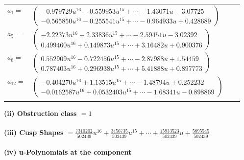 \documentclass[1p]{elsarticle_modified}
\theoremstyle{definition}
\begin{document}
\begin{tabular}{m{7pt} m{180pt} m{7pt} m{180pt} }
\flushright $a_{1}=$&$\begin{pmatrix}-0.979729 u^{16}-0.559953 u^{15}+\cdots-1.43071 u-3.07725\\-0.565850 u^{16}-0.255541 u^{15}+\cdots-0.964933 u+0.428689\end{pmatrix}$ \\
\flushright $a_{5}=$&$\begin{pmatrix}-2.22373 u^{16}-2.33836 u^{15}+\cdots-2.59451 u-3.02392\\0.499460 u^{16}+0.149873 u^{15}+\cdots+3.16482 u+0.900376\end{pmatrix}$ \\
\flushright $a_{8}=$&$\begin{pmatrix}0.552909 u^{16}-0.722456 u^{15}+\cdots-2.87988 u+1.54459\\0.787403 u^{16}+0.296938 u^{15}+\cdots+5.41888 u+0.897773\end{pmatrix}$ \\
\flushright $a_{12}=$&$\begin{pmatrix}-0.404270 u^{16}+1.13515 u^{15}+\cdots-1.48794 u+0.252232\\-0.0162587 u^{16}+0.0532403 u^{15}+\cdots-1.68341 u-0.898869\end{pmatrix}$\\&\end{tabular}
\flushleft \textbf{(ii) Obstruction class $= 1$}\\~\\
\flushleft \textbf{(iii) Cusp Shapes $= \frac{7310202}{502439} u^{16}+\frac{3456735}{502439} u^{15}+\cdots+\frac{15933523}{502439} u+\frac{5895545}{502439}$}\\~\\
\newpage\renewcommand{\arraystretch}{1}
\flushleft \textbf{(iv) u-Polynomials at the component}\newline \\
\end{document}
